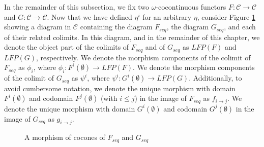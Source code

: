 \documentclass{msthesis}
\theoremstyle{definition}
\newcommand{\mcC}{\mathcal{C}}
\begin{document}
In the remainder of this subsection, we fix two $\omega$-cocontinuous functors $F : \mcC \to \mcC$ and $G : \mcC \to \mcC$.  Now that we have defined $\eta^i$ for an arbitrary $\eta$, consider Figure \ref{fig:lfpmorphism} showing a diagram in $\mcC$ containing the diagram $F_{seq}$, the diagram $G_{seq}$, and each of their related colimits.  In this diagram, and in the remainder of this chapter, we denote the object part of the colimits of $F_{seq}$ and of $G_{seq}$ as $LFP(F)$ and $LFP(G)$, respectively.  We denote the morphism components of the colimit of $F_{seq}$ as $\phi_i$, where $\phi_i : F^i(\emptyset) \to LFP(F)$.  We denote the morphism components of the colimit of $G_{seq}$ as $\psi^i$, where $\psi^i : G^i(\emptyset) \to LFP(G)$.  Additionally, to avoid cumbersome notation, we denote the unique morphism with domain $F^i(\emptyset)$ and codomain $F^j(\emptyset)$ (with $i \le j$) in the image of $F_{seq}$ as $f_{i \to j}$.  We denote the unique morphism with domain $G^i(\emptyset)$ and codomain $G^j(\emptyset)$ in the image of $G_{seq}$ as $g_{i \to j}$.

\begin{figure}[htbp]
    \centering
{    
    \caption{A morphism of cocones of $F_{seq}$ and $G_{seq}$}
    \label{fig:lfpmorphism}
}
\end{figure}
\end{document}
